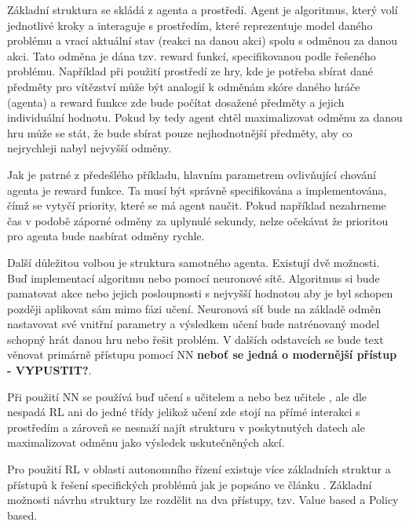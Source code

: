 \documentclass[czech, bc, kky, he, iso690numb]{fasthesis}
\begin{document}
            Základní struktura se skládá z agenta a prostředí. Agent je algoritmus, který volí jednotlivé kroky a interaguje s prostředím, které reprezentuje model daného problému a vrací aktuální stav (reakci na danou akci) spolu s odměnou za danou akci. Tato odměna je dána tzv. reward funkcí, specifikovanou podle řešeného problému. Například při použití prostředí ze hry, kde je potřeba sbírat dané předměty pro vítězství může být analogií k odměnám skóre daného hráče (agenta) a reward funkce zde bude počítat dosažené předměty a jejich individuální hodnotu. Pokud by tedy agent chtěl maximalizovat odměnu za danou hru může se stát, že bude sbírat pouze nejhodnotnější předměty, aby co nejrychleji nabyl nejvyšší odměny.
            
            Jak je patrné z předešlého příkladu, hlavním parametrem ovlivňující chování agenta je reward funkce. Ta musí být správně specifikována a implementována, čímž se vytyčí priority, které se má agent naučit. Pokud například nezahrneme čas v podobě záporné odměny za uplynulé sekundy, nelze očekávat že prioritou pro agenta bude nasbírat odměny rychle.
            
            Další důležitou volbou je struktura samotného agenta. Existují dvě možnosti. Buď implementací algoritmu nebo pomocí neuronové sítě. Algoritmus si bude pamatovat akce nebo jejich posloupnosti s nejvyšší hodnotou aby je byl schopen později aplikovat sám mimo fázi učení. Neuronová síť bude na základě odměn nastavovat své vnitřní parametry a výsledkem učení bude natrénovaný model schopný hrát danou hru nebo řešit problém. V dalších odstavcích se bude text věnovat primárně přístupu pomocí NN\textbf{ neboť se jedná o modernější přístup - VYPUSTIT?}.
            
            Při použití NN se používá buď učení s učitelem a nebo bez učitele , ale dle \cite[p.~2]{RLbook} nespadá RL ani do jedné třídy jelikož učení zde stojí na přímé interakci s prostředím a zároveň se nesnaží najít strukturu v poskytnutých datech ale maximalizovat odměnu jako výsledek uskutečněných akcí.
            
            Pro použití RL v oblasti autonomního řízení existuje více základních struktur a přístupů k řešení specifických problémů jak je popsáno ve článku \cite{Deep_RL_survey}. Základní možnosti návrhu struktury lze rozdělit na dva přístupy, tzv. Value based a Policy based.
            
\end{document}
